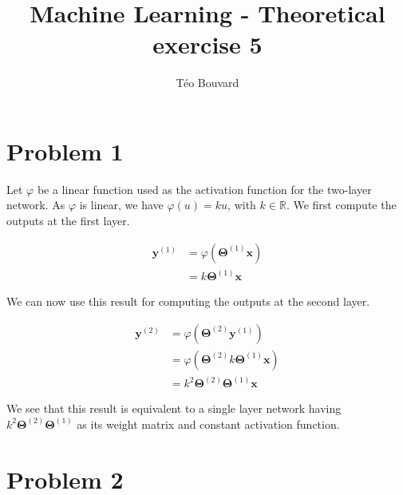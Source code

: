 \documentclass[a4paper, 10pt, twoside]{article}
\begin{document}
\title{Machine Learning - Theoretical exercise 5}
\author{T\'eo Bouvard}
\maketitle

\section*{Problem 1}
Let $\varphi$ be a linear function used as the activation function for the two-layer network. As $\varphi$ is linear, we have $\varphi(u) = ku$, with $k \in \mathbb{R}$.
We first compute the outputs at the first layer.

\begin{align*}
	\bm{y}^{(1)} & = \varphi\left(\bm{\Theta}^{(1)}\bm{x}\right) \\
	             & = k\bm{\Theta}^{(1)}\bm{x}
\end{align*}

We can now use this result for computing the outputs at the second layer.

\begin{align*}
	\bm{y}^{(2)} & = \varphi\left(\bm{\Theta}^{(2)}\bm{y}^{(1)}\right)             \\
	             & = \varphi\left(\bm{\Theta}^{(2)}k\bm{\Theta}^{(1)}\bm{x}\right) \\
	             & = k^2\bm{\Theta}^{(2)}\bm{\Theta}^{(1)}\bm{x}
\end{align*}

We see that this result is equivalent to a single layer network having $k^2\bm{\Theta}^{(2)}\bm{\Theta}^{(1)}$ as its weight matrix and constant activation function.

\section*{Problem 2}
\end{document}
